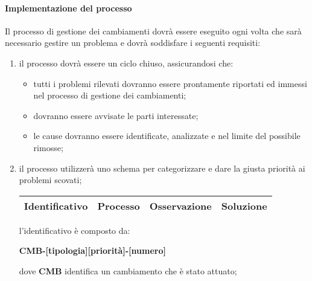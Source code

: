 		\paragraph{Implementazione del processo}
			Il processo di gestione dei cambiamenti dovrà essere eseguito ogni volta che sarà necessario gestire un problema e dovrà soddisfare i seguenti requisiti:
			\begin{enumerate}
				\item il processo dovrà essere un ciclo chiuso, assicurandosi che:
					\begin{itemize}
				 		\item tutti i problemi rilevati dovranno essere prontamente riportati ed immessi nel processo di gestione dei cambiamenti;
					 	\item dovranno essere avvisate le parti interessate;
				 		\item le cause dovranno essere identificate, analizzate e nel limite del possibile rimosse;
					 \end{itemize}

				\item il processo utilizzerà uno schema per categorizzare e dare la giusta priorità ai problemi scovati;

					\begin{center}
						\begin{longtable}{|c|c|c|c|}
							\hline
							\rowcolor{lighter-grayer}
							
							\textbf{Identificativo} & 
							\textbf{Processo} & 
							\textbf{Osservazione} & 
							\textbf{Soluzione}\\
							\hline
							\endfirsthead
							\hline

						\end{longtable}
					\end{center}

				 l'identificativo è composto da:
				 	\begin{center}
						\textbf{CMB-[tipologia][priorità]-[numero]}
					\end{center}

				 dove \textbf{CMB} identifica un cambiamento che è stato attuato;


\end{enumerate}
